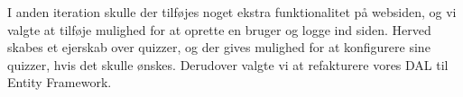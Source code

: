 
I anden iteration skulle der tilføjes noget ekstra funktionalitet på websiden, og vi valgte at tilføje mulighed for at oprette en bruger og logge ind siden. Herved skabes et ejerskab over quizzer, og der gives mulighed for at konfigurere sine quizzer, hvis det skulle ønskes. Derudover valgte vi at refakturere vores DAL til Entity Framework. 












